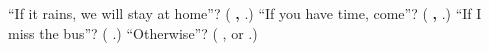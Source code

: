 \begin{tcolorbox}[breakable,colback=teal!4,colframe=teal!35!black,title={Before you move on}]
\textquotedblleft{}If it rains, we will stay at home\textquotedblright{}? (\textbf{  ,     }.) \textquotedblleft{}If you have time, come\textquotedblright{}? (\textbf{  ,  }.) \textquotedblleft{}If I miss the bus\textquotedblright{}? (\textbf{    }.) \textquotedblleft{}Otherwise\textquotedblright{}? (\textbf{ }, or \textbf{}.)
\end{tcolorbox}
